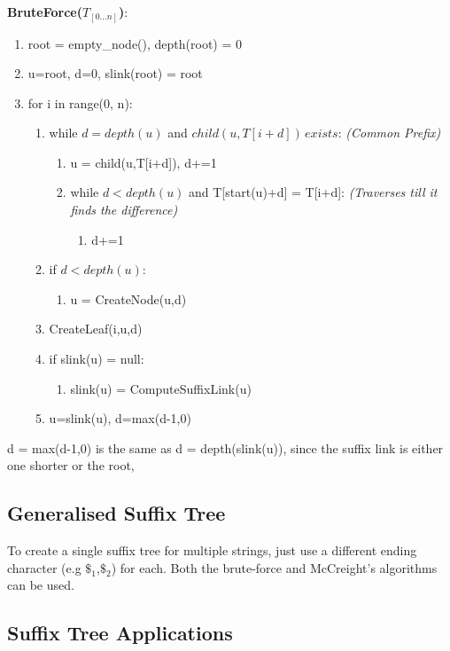 \textbf{BruteForce($T_{[0\dots n]}$)}:
\begin{enumerate}[label=\Alph*]
    \item root = empty\_node(), depth(root) = 0
    \item u=root, d=0, slink(root) = root
    \item for i in range(0, n):
\begin{enumerate}[label=\arabic*]
    \item while $d = depth(u)$ and $child(u,T[i+d])\, exists$: \emph{(Common Prefix)}
    \begin{enumerate}
        \item u = child(u,T[i+d]), d+=1
        \item while $d < depth(u)$ and T[start(u)+d] = T[i+d]: \emph{(Traverses till it finds the difference)}
        \begin{enumerate}
            \item [] d+=1
        \end{enumerate} 
    \end{enumerate}
    \item if $d < depth(u)$:
    \begin{enumerate}
        \item [] u = CreateNode(u,d)
    \end{enumerate}    
    \item CreateLeaf(i,u,d)
    \item if slink(u) =  null:
        \begin{enumerate}
        \item [] slink(u) = ComputeSuffixLink(u)
    \end{enumerate}  
    \item u=slink(u), d=max(d-1,0)
\end{enumerate}    
\end{enumerate}
d = max(d-1,0) is the same as d = depth(slink(u)), since the suffix link is either one shorter or the root, 

\subsection{Generalised Suffix Tree}
To create a single suffix tree for multiple strings, just use a different ending character (e.g $\$_1$,$\$_2$) for each. Both the brute-force and McCreight's algorithms can be used.

\subsection{Suffix Tree Applications}

